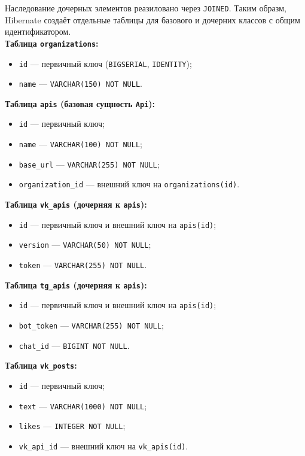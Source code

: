 \documentclass[11pt,a4paper]{article}
\begin{document}
Наследование дочерных элементов реазиловано через \texttt{JOINED}. Таким образм, Hibernate создаёт отдельные таблицы для базового и дочерних классов с общим идентификатором.\\

\textbf{Таблица \texttt{organizations}:}
\begin{itemize}
    \item \texttt{id} --- первичный ключ (\texttt{BIGSERIAL}, \texttt{IDENTITY});
    \item \texttt{name} --- \texttt{VARCHAR(150) NOT NULL}.
\end{itemize}

\textbf{Таблица \texttt{apis} (базовая сущность \texttt{Api}):}
\begin{itemize}
    \item \texttt{id} --- первичный ключ;
    \item \texttt{name} --- \texttt{VARCHAR(100) NOT NULL};
    \item \texttt{base\_url} --- \texttt{VARCHAR(255) NOT NULL};
    \item \texttt{organization\_id} --- внешний ключ на \texttt{organizations(id)}.
\end{itemize}

\textbf{Таблица \texttt{vk\_apis} (дочерняя к \texttt{apis}):}
\begin{itemize}
    \item \texttt{id} --- первичный ключ и внешний ключ на \texttt{apis(id)};
    \item \texttt{version} --- \texttt{VARCHAR(50) NOT NULL};
    \item \texttt{token} --- \texttt{VARCHAR(255) NOT NULL}.
\end{itemize}

\textbf{Таблица \texttt{tg\_apis} (дочерняя к \texttt{apis}):}
\begin{itemize}
    \item \texttt{id} --- первичный ключ и внешний ключ на \texttt{apis(id)};
    \item \texttt{bot\_token} --- \texttt{VARCHAR(255) NOT NULL};
    \item \texttt{chat\_id} --- \texttt{BIGINT NOT NULL}.
\end{itemize}

\textbf{Таблица \texttt{vk\_posts}:}
\begin{itemize}
    \item \texttt{id} --- первичный ключ;
    \item \texttt{text} --- \texttt{VARCHAR(1000) NOT NULL};
    \item \texttt{likes} --- \texttt{INTEGER NOT NULL};
    \item \texttt{vk\_api\_id} --- внешний ключ на \texttt{vk\_apis(id)}.
\end{itemize}
\end{document}
